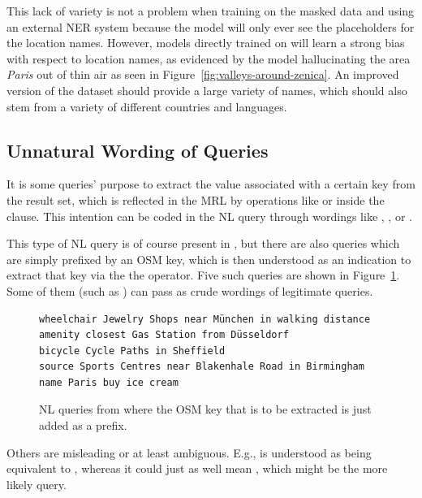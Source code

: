 This lack of variety is not a problem when training on the masked data and using
an external NER system because the model will only ever see the placeholders for
the location names. However, models directly trained on \nlmapstwo{} will learn
a strong bias with respect to location names, as evidenced by the model
hallucinating the area \emph{Paris} out of thin air as seen in
Figure~\ref{fig:valleys-around-zenica}. An improved version of the dataset
should provide a large variety of names, which should also stem from a variety
of different countries and languages.

\subsection{Unnatural Wording of Queries}
\label{sec:unnatural-wording}

It is some queries’ purpose to extract the value associated with a certain key
from the result set, which is reflected in the MRL by operations like
 or  inside the 
clause. This intention can be coded in the NL query through wordings like
, ,  or .

This type of NL query is of course present in \nlmapstwo{}, but there are also
queries which are simply prefixed by an OSM key, which is then understood as an
indication to extract that key via the the  operator. Five such
queries are shown in Figure~\ref{fig:nlmaps-v2-unnatural-wording}. Some of them
(such as ) can pass as crude wordings of legitimate
queries.

\begin{figure}[h]
  \centering
  \begin{lstlisting}[basicstyle=\small]
wheelchair Jewelry Shops near München in walking distance
amenity closest Gas Station from Düsseldorf
bicycle Cycle Paths in Sheffield
source Sports Centres near Blakenhale Road in Birmingham
name Paris buy ice cream
  \end{lstlisting}
  \caption[Unnatural \nlmapstwo{} queries]{NL queries from \nlmapstwo{} where
    the OSM key that is to be extracted is just added as a prefix.}
  \label{fig:nlmaps-v2-unnatural-wording}
\end{figure}

Others are misleading or at least ambiguous. E.g.,  is understood as being equivalent to
,
whereas it could just as well mean , which might be the more likely query.

